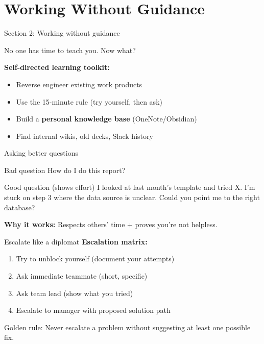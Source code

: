\documentclass[aspectratio=169, 11pt]{beamer}
\begin{document}
	\section{Working Without Guidance}
	\begin{frame}{Section 2: Working without guidance}
		\begin{center}
			\large{No one has time to teach you. Now what?}
		\end{center}
		\vspace{0.4cm}
		\textbf{Self-directed learning toolkit:}
		\begin{itemize}
			\item Reverse engineer existing work products
			\item Use the   15-minute rule  (try yourself, then ask)
			\item Build a \textbf{personal knowledge base} (OneNote/Obsidian)
			\item Find internal wikis, old decks, Slack history
		\end{itemize}
	\end{frame}
	
	\begin{frame}{Asking better questions}
		\begin{block}{Bad question}
		  How do I do this report? 
		\end{block}
		\begin{block}{Good question (shows effort)}
			 I looked at last month's template and tried X. I'm stuck on step 3 where the data source is unclear. Could you point me to the right database?  
		\end{block}
		\textbf{Why it works:} Respects others' time + proves you're not helpless.
 	\end{frame}
	
	\begin{frame}{Escalate like a diplomat}
		\textbf{Escalation matrix:}
		\begin{enumerate}
			\item Try to unblock yourself (document your attempts)
			\item Ask immediate teammate (short, specific)
			\item Ask team lead (show what you tried)
			\item Escalate to manager with proposed solution path
		\end{enumerate}
		\vspace{0.2cm}
		\alert{Golden rule:} Never escalate a problem without suggesting at least one possible fix.
	\end{frame}
	
\end{document}
